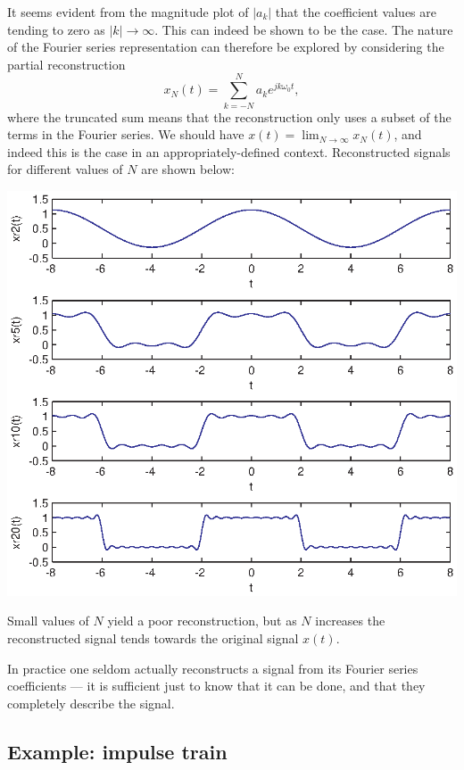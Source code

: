 \documentclass[10pt]{beamer}
\begin{document}
It seems evident from the magnitude plot of $|a_k|$ that the coefficient values are tending to zero as $|k| \to \infty$.  This can indeed be shown to be the case.  The nature of the Fourier series representation can therefore be explored by considering the partial reconstruction
\begin{equation*}
  x_N(t) = \sum_{k=-N}^{N} a_k e^{j k \omega_0 t},
\end{equation*}
where the truncated sum means that the reconstruction only uses a subset of the terms in the Fourier series.  We should have $x(t) = \lim_{N \to \infty} x_N(t)$, and indeed this is the case in an appropriately-defined context.  Reconstructed signals for different values of $N$ are shown below:
\begin{center}
  \includegraphics{exrectpulsetrain3}
\end{center}
Small values of $N$ yield a poor reconstruction, but as $N$ increases the reconstructed signal tends towards the original signal $x(t)$. 

In practice one seldom actually reconstructs a signal from its Fourier series coefficients --- it is sufficient just to know that it can be done, and that they completely describe the signal.

\subsection{Example:  impulse train}
\end{document}
